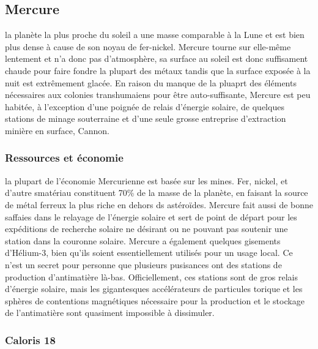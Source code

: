                                                       \subsection{Mercure} \label{sec:mercury} 

                                                      la planète la plus proche du soleil a une masse comparable à la Lune et est bien plus dense à cause de son noyau de fer-nickel. Mercure tourne sur elle-même lentement et n'a donc pas d'atmosphère, sa surface au soleil est donc suffisament chaude pour faire fondre la plupart des métaux tandis que la surface exposée à la nuit est extrêmement glacée. En raison du manque de la pluaprt des éléments nécessaires aux colonies transhumaiens pour être auto-suffisante, Mercure est peu habitée, à l'exception d'une poignée de relais d'énergie solaire, de quelques stations de minage souterraine et d'une seule grosse entreprise d'extraction minière en surface, Cannon. 

                                                      \subsubsection{Ressources et économie} \label{sec:resources-and-economics} 

                                                      la plupart de l'économie Mercurienne est basée sur les mines. Fer, nickel, et d'autre smatériau constituent 70\% de la masse de la planète, en faisant la source de métal ferreux la plus riche en dehors ds astéroïdes. Mercure fait aussi de bonne saffaies dans le relayage de l'énergie solaire et sert de point de départ pour les expéditions de recherche solaire ne désirant ou ne pouvant pas soutenir une station dans la couronne solaire. Mercure a également quelques gisements d'Hélium-3, bien qu'ils soient essentiellement utilisés pour un usage local. Ce n'est un secret pour personne que plusieurs pusisances ont des stations de production d'antimatière là-bas. Officiellement, ces stations sont de gros relais d'énergie solaire, mais les gigantesques accélérateurs de particules torique et les sphères de contentions magnétiques nécessaire pour la production et le stockage de l'antimatière sont quasiment impossible à dissimuler. 

                                                      \subsubsection{Caloris 18} \label{sec:caloris-18} 

